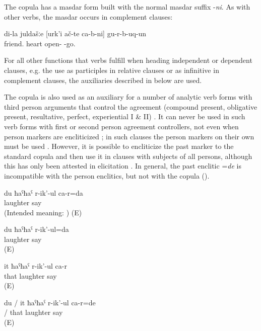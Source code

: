 The copula has a masdar form built with the normal masdar suffix -\textit{ni}. As with other verbs, the masdar occurs in complement clauses:

\begin{exe}
	\ex	\label{ex:My friends turned out to be open-hearted.}
	\gll	di-la		juldašːe		[urk'i	ač-te		ca-b-ni]			gu-r-b-uq-un\\
			friend.	heart	open- 		-go.\\
	\glt	{}
\end{exe}



For all other functions that verbs fulfill when heading independent or dependent clauses, e.g. the use as participles in relative clauses or as infinitive in complement clauses, the auxiliaries described in  below are used. 

The copula is also used as an auxiliary for a number of analytic verb forms with third person arguments that control the agreement (compound present, obligative present, resultative, perfect, experiential I \& II) . It can never be used in such verb forms with first or second person agreement controllers, not even when person markers are encliticized ; in such clauses the person markers on their own must be used . However, it is possible to encliticize the past marker  to the standard copula and then use it in clauses with subjects of all persons, although this has only been attested in elicitation . In general, the past enclitic =\textit{de} is incompatible with the person enclitics, but not with the copula ().
%
\begin{exe}
	\ex	\label{ex:ungrammaticalIamlaughing}
	\gll	*du	ħaˁħaˁ	r-ik'-ul	ca-r=da\\
		\hphantom{*}	laughter say	\\
	\glt	(Intended meaning: ) (E)

	\ex	\label{ex:I am laughing}
	\gll	du	ħaˁħaˁ	r-ik'-ul=da\\
			laughter say\\
	\glt	{} (E)

	\ex	\label{ex:She is laughing}
	\gll	it	ħaˁħaˁ	r-ik'-ul	ca-r\\
		that	laughter say	\\
	\glt	{} (E)

	\ex	\label{ex:I was / She was laughing}
	\gll	du	/	it	ħaˁħaˁ	r-ik'-ul	ca-r=de\\
			/	that	laughter say	\\
	\glt	{} (E)
\end{exe}

